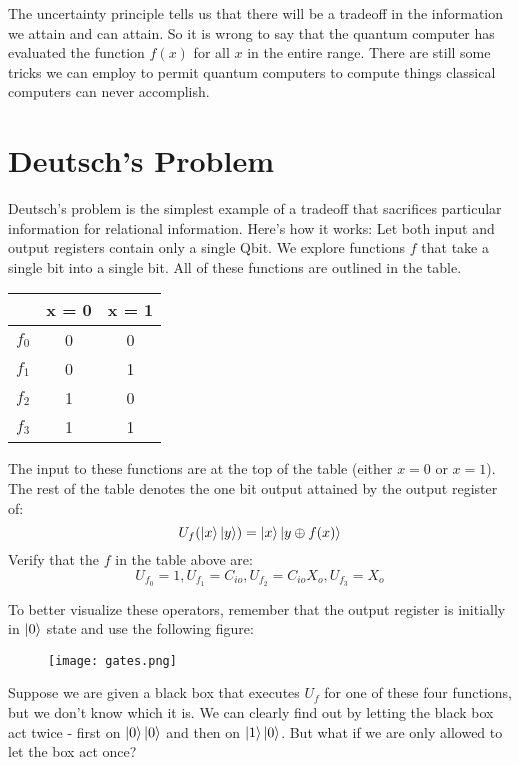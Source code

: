 \documentclass[letterpaper]{article}
\begin{document}
The uncertainty principle tells us that there will be a tradeoff in the information we attain and can attain. So it is wrong to say that the quantum computer has evaluated the function $f(x)$ for all $x$ in the entire range. There are still some tricks we can employ to permit quantum computers to compute things classical computers can never accomplish. 

\section{Deutsch's Problem}
Deutsch's problem is the simplest example of a tradeoff that sacrifices particular information for relational information. Here's how it works: Let both input and output registers contain only a single Qbit. We explore functions $f$ that take a single bit into a single bit. All of these functions are outlined in the table. 
\begin{table}[h!]
\centering
\begin{tabular}{|r|c|c|}
\hline 
 & \textbf{x = 0} & \textbf{x = 1} \\
\hline
$f_{0}$ & 0 & 0 \\
\hline
$f_{1}$ & 0 & 1 \\
\hline 
$f_{2}$ & 1 & 0 \\
\hline 
$f_{3}$ & 1 & 1 \\
\hline
\end{tabular}
\end{table}

The input to these functions are at the top of the table (either $x=0$ or $x=1$). The rest of the table denotes the one bit output attained by the output register of:
$$U_{f}(\ket{x} \ket{y}) = \ket{x}\ket{y \oplus f(x)}
$$
Verify that the $f$ in the table above are: 
$$ U_{f_{0}} = 1, U_{f_{1}} = C_{io}, U_{f_{2}} = C_{io}X_{o}, U_{f_{3}} = X_{o} $$

To better visualize these operators, remember that the output register is initially in $\ket{0}$ state and use the following figure:

\begin{figure}[h!]
	\centering
	\texttt{[image: gates.png]}
\end{figure}

Suppose we are given a black box that executes $U_{f}$ for one of these four functions, but we don't know which it is. We can clearly find out by letting the black box act twice - first on $\ket{0} \ket{0}$ and then on $\ket{1} \ket{0}$. But what if we are only allowed to let the box act once?
\end{document}
